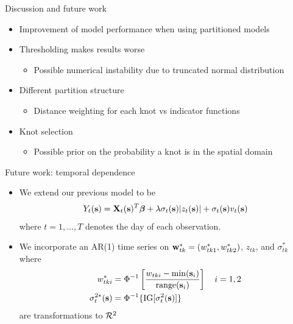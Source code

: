 \documentclass{beamer}
\begin{document}
\begin{frame}{Discussion and future work}
  \begin{itemize} \setlength{\itemsep}{0.5em}
    \item Improvement of model performance when using partitioned models
    \item Thresholding makes results worse
    \begin{itemize}
      \item Possible numerical instability due to truncated normal distribution
    \end{itemize}
    \item Different partition structure
    \begin{itemize}
      \item Distance weighting for each knot vs indicator functions
    \end{itemize}
    \item Knot selection
    \begin{itemize}
      \item Possible prior on the probability a knot is in the spatial domain
    \end{itemize}
  \end{itemize}
\end{frame}

\begin{frame}{Future work: temporal dependence}
  \begin{itemize} \setlength{\itemsep}{0.5em}
    \item We extend our previous model to be
    \begin{align*}
      Y_t(\mbox{\bf s}) = \mbox{\bf X}_t(\mbox{\bf s})^T \mbox{\boldmath $\beta$} + \lambda \sigma_t(\mbox{\bf s}) | z_t(\mbox{\bf s}) | + \sigma_t(\mbox{\bf s}) v_t(\mbox{\bf s})
    \end{align*}
    where $t = 1, \ldots, T$ denotes the day of each observation.
    \item We incorporate an AR(1) time series on $\mbox{\bf w}^*_{tk} = (w^*_{tk1}, w^*_{tk2})$, $z_{tk}$, and $\sigma^*_{tk}$ where
    \begin{align*}
      w^*_{tki} &= \Phi^{-1}\left[ \frac{w_{tki} - \min(\mbox{\bf s}_i)}{ \text{range}(\mbox{\bf s}_i)}\right] \quad i = 1, 2 \\
      \sigma^{2*}_t(\mbox{\bf s}) &= \Phi^{-1}\{ \text{IG}[\sigma^2_t(\mbox{\bf s})] \}
    \end{align*}
    are transformations to ${\cal R}^2$
  \end{itemize}
\end{frame}
\end{document}
